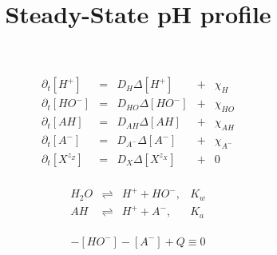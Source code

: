\documentclass[aps,12pt]{revtex4}
\begin{document}
\title{Steady-State pH profile}
\maketitle


\begin{equation}
\begin{array}{rclcl}
	\partial_t [H^+]  & = & D_H \Delta [H^+]     &+&\chi_H\\
	\partial_t [HO^-] & = & D_{HO} \Delta [HO^-] &+&\chi_{HO}\\
	\partial_t [AH]   & = & D_{AH} \Delta [AH]   &+&\chi_{AH}\\
	\partial_t [A^-]  & = & D_{A^-} \Delta [A^-] &+& \chi_{A^-}\\
	\partial_t [X^{z_Z}] & = & D_X \Delta [X^{z_X}] &+& 0\\
\end{array}
\end{equation}

\begin{equation}
	\begin{array}{rcll}
	H_2O  & \rightleftharpoons & H^+ + HO^-, & K_w\\
	AH    & \rightleftharpoons & H^+ + A^-,  & K_a\\
	\end{array}
\end{equation}

\begin{equation}
	[H^+]-[HO^-]-[A^-]+Q\equiv0
\end{equation}
\end{document}
